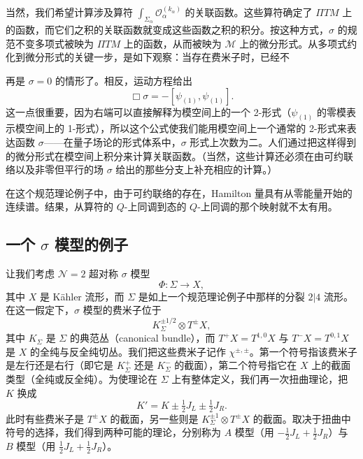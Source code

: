 当然，我们希望计算涉及算符 $\int_{\Sigma_\alpha}\mathcal O_\alpha^{(k_\alpha)}$ 的关联函数。这些算符确定了 $\Pi TM$ 上的函数，而它们之积的关联函数就变成这些函数之积的积分。按这种方式，$\sigma$ 的规范不变多项式被映为 $\Pi TM$ 上的函数，从而被映为 $\mathcal M$ 上的微分形式。从多项式约化到微分形式的关键一步，是如下观察：当存在费米子时，已经不 %


再是 $\sigma=0$ 的情形了。相反，运动方程给出
\[
  \Box\sigma=-[\psi_{(1)},\psi_{(1)}].
\]
这一点很重要，因为右端可以直接解释为模空间上的一个 2-形式（$\psi_{(1)}$ 的零模表示模空间上的 1-形式），所以这个公式使我们能用模空间上一个通常的 2-形式来表达函数 $\sigma$——在量子场论的形式体系中，$\sigma$ 形式上次数为二。人们通过把这样得到的微分形式在模空间上积分来计算关联函数。（当然，这些计算还必须在由可约联络以及非零但平行的场 $\sigma$ 给出的那些分支上补充相应的计算。）

在这个规范理论例子中，由于可约联络的存在，Hamilton 量具有从零能量开始的连续谱。结果，从算符的 $Q$-上同调到态的 $Q$-上同调的那个映射就不太有用。


\subsection{一个 $\sigma$ 模型的例子}

让我们考虑 $\mathcal N=2$ 超对称 $\sigma$ 模型
\[
  \Phi:\Sigma\longrightarrow X,
\]
其中 $X$ 是 Kähler 流形，而 $\Sigma$ 是如上一个规范理论例子中那样的分裂 $2|4$ 流形。在这一假定下，$\sigma$ 模型的费米子位于
\[
  K_\Sigma^{\pm1/2}\otimes T^{\pm}X,
\]
其中 $K_\Sigma$ 是 $\Sigma$ 的典范丛（canonical bundle），而 $T^+X=T^{1,0}X$ 与 $T^-X=T^{0,1}X$ 是 $X$ 的全纯与反全纯切丛。我们把这些费米子记作 $\chi^{\pm,\pm}$。第一个符号指该费米子是左行还是右行（即它是 $K_\Sigma^+$ 还是 $K_\Sigma^-$ 的截面），第二个符号指它在 $X$ 上的截面类型（全纯或反全纯）。为使理论在 $\Sigma$ 上有整体定义，我们再一次扭曲理论，把 $K$ 换成
\[
  K'=K\pm\tfrac12J_L\pm\tfrac12J_R.
\]
此时有些费米子是 $T^{\pm}X$ 的截面，另一些则是 $K_\Sigma^{\pm1}\otimes T^{\pm}X$ 的截面。取决于扭曲中符号的选择，我们得到两种可能的理论，分别称为 $A$ 模型（用 $-\tfrac12J_L+\tfrac12J_R$）与 $B$ 模型（用 $\tfrac12J_L+\tfrac12J_R$）。


